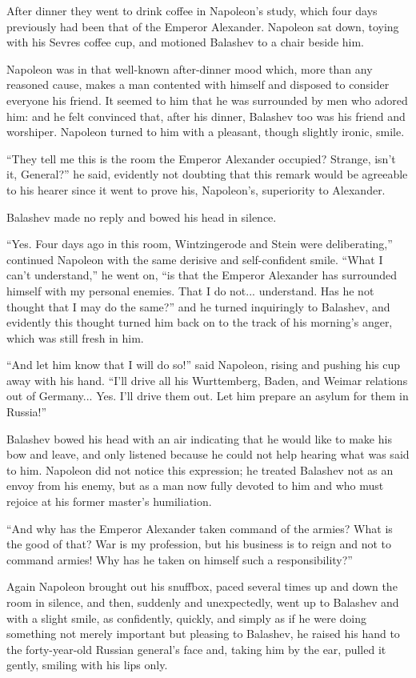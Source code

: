 After dinner they went to drink coffee in Napoleon's study, which
four days previously had been that of the Emperor
Alexander. Napoleon sat down, toying with his Sevres coffee cup,
and motioned Balashev to a chair beside him.

Napoleon was in that well-known after-dinner mood which, more
than any reasoned cause, makes a man contented with himself and
disposed to consider everyone his friend. It seemed to him that
he was surrounded by men who adored him: and he felt convinced
that, after his dinner, Balashev too was his friend and
worshiper. Napoleon turned to him with a pleasant, though
slightly ironic, smile.

``They tell me this is the room the Emperor Alexander occupied?
Strange, isn't it, General?'' he said, evidently not doubting
that this remark would be agreeable to his hearer since it went
to prove his, Napoleon's, superiority to Alexander.

Balashev made no reply and bowed his head in silence.

``Yes. Four days ago in this room, Wintzingerode and Stein were
deliberating,'' continued Napoleon with the same derisive and
self-confident smile. ``What I can't understand,'' he went on,
``is that the Emperor Alexander has surrounded himself with my
personal enemies. That I do not... understand. Has he not thought
that I may do the same?'' and he turned inquiringly to Balashev,
and evidently this thought turned him back on to the track of his
morning's anger, which was still fresh in him.

``And let him know that I will do so!'' said Napoleon, rising and
pushing his cup away with his hand. ``I'll drive all his
Wurttemberg, Baden, and Weimar relations out of
Germany... Yes. I'll drive them out. Let him prepare an asylum
for them in Russia!''

Balashev bowed his head with an air indicating that he would like
to make his bow and leave, and only listened because he could not
help hearing what was said to him. Napoleon did not notice this
expression; he treated Balashev not as an envoy from his enemy,
but as a man now fully devoted to him and who must rejoice at his
former master's humiliation.

``And why has the Emperor Alexander taken command of the armies?
What is the good of that? War is my profession, but his business
is to reign and not to command armies! Why has he taken on
himself such a responsibility?''

Again Napoleon brought out his snuffbox, paced several times up
and down the room in silence, and then, suddenly and
unexpectedly, went up to Balashev and with a slight smile, as
confidently, quickly, and simply as if he were doing something
not merely important but pleasing to Balashev, he raised his hand
to the forty-year-old Russian general's face and, taking him by
the ear, pulled it gently, smiling with his lips only.


